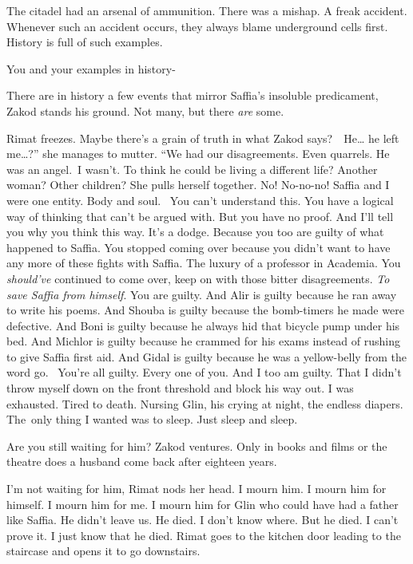 \documentclass[twoside,11pt]{book}
\begin{document}
{\textquotedbl}The citadel had an arsenal of ammunition. There was a mishap. A freak accident. Whenever such an accident
occurs, they always blame underground cells first. History is full of such examples.{\textquotedbl} 

{\textquotedbl}You and your examples in history-{\textquotedbl} 

{\textquotedbl}There are in history a few events that mirror Saffia's insoluble predicament,{\textquotedbl} Zakod stands
his ground. {\textquotedbl}Not many, but there \textit{are} some.{\textquotedbl}

Rimat freezes. Maybe there's a grain of truth in what Zakod says?\ \ {\textquotedbl}He{\dots} he left me{\dots}?'' she
manages to mutter. ``We had our disagreements. Even quarrels. He was an angel.\ I wasn't. To think he could be living a
different life? Another woman? Other children?{\textquotedbl} She pulls herself together. {\textquotedbl}No! No-no-no!
Saffia and I were one entity. Body and soul.~ You can't understand this. You have a logical way of thinking that can't
be argued with. But you have no proof. And I'll tell you why you think this way. It's a dodge. Because you too are
guilty of what happened to Saffia. You stopped coming over because you didn't want to have any more of these fights
with Saffia. The luxury of a professor in Academia. You \textit{should've} continued to come over, keep on with those
bitter disagreements. \textit{To save Saffia from himself}. You are guilty. And Alir is guilty because he ran away to
write his poems. And Shouba is guilty because the bomb-timers he made were defective. And Boni is guilty because he
always hid that bicycle pump under his bed. And Michlor is guilty because he crammed for his exams instead of rushing
to give Saffia first aid. And Gidal is guilty because he was a yellow-belly from the word go. \ You{}'re all guilty.
Every one of you. And I too am guilty. That I didn't throw myself down on the front threshold and block his way out. I
was exhausted. Tired to death. Nursing Glin, his crying at night, the endless diapers. The~only thing I wanted was to
sleep. Just sleep and sleep.{\textquotedbl} 

{\textquotedbl}Are you still waiting for him?{\textquotedbl} Zakod ventures. {\textquotedbl}Only in books and films or
the theatre does a husband come back after eighteen years.{\textquotedbl}

{\textquotedbl}I'm not waiting for him,{\textquotedbl} Rimat nods her head. {\textquotedbl}I mourn him. I mourn him for
himself. I mourn him for me. I mourn him for Glin who could have had a father like Saffia. He didn't leave us. He died.
I don't know where. But he died. I can't prove it. I just know that he died.{\textquotedbl} Rimat goes to the kitchen
door leading to the staircase and opens it to go downstairs. 
\end{document}
